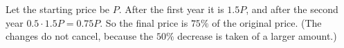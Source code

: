 Let the starting price be $P$. After the first year it is $1.5P$, and after the second year $0.5\cdot1.5P=0.75P$. So the final price is $\boxed{75\%}$ of the original price. (The changes do not cancel, because the $50\%$ decrease is taken of a larger amount.)

